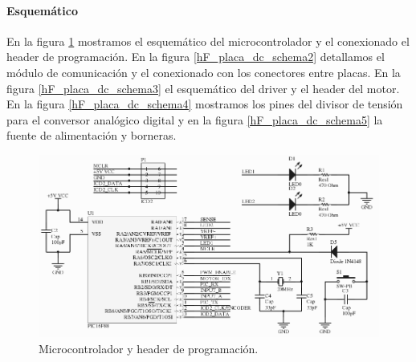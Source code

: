 \paragraph{Esquem\'atico}
\label{h_placas_motorDC_esquematico}

En la figura \ref{hF_placa_dc_schema} mostramos el esquem\'atico del microcontrolador y el conexionado el header
de programaci\'on.
En la figura \ref{hF_placa_dc_schema2} detallamos el m\'odulo de comunicaci\'on y el conexionado con los conectores
entre placas.
En la figura \ref{hF_placa_dc_schema3} el esquem\'atico del driver y el header del motor.
En la figura \ref{hF_placa_dc_schema4} mostramos los pines del divisor de tensi\'on para el conversor anal\'ogico
digital y en la figura \ref{hF_placa_dc_schema5} la fuente de alimentaci\'on y borneras.

\begin{figure}
	\centering
	\includegraphics[scale=.3]{figuras/dc_schemaMicro.png}
	\caption{Microcontrolador y header de programaci\'on.}
	\label{hF_placa_dc_schema}
\end{figure}

